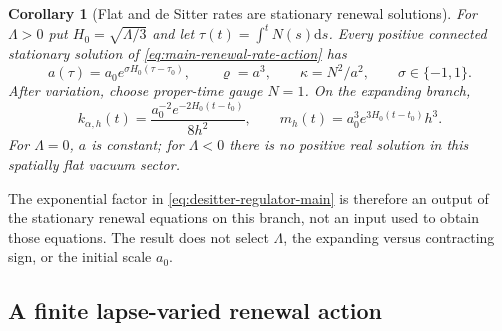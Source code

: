 \documentclass[11pt]{article}
\newtheorem{corollary}[corollary]{Corollary}
\theoremstyle{definition}
\theoremstyle{remark}
\newcommand{\dd}{\mathrm d}
\begin{document}
\begin{corollary}[Flat and de Sitter rates are stationary renewal solutions]
\label{cor:main-derived-desitter-rates}
For $\Lambda>0$ put $H_0=\sqrt{\Lambda/3}$ and let
$\tau(t)=\int^tN(s)\dd s$.  Every positive connected stationary solution of
\eqref{eq:main-renewal-rate-action} has
\begin{equation}
 a(\tau)=a_0e^{\sigma H_0(\tau-\tau_0)},\qquad
 \varrho=a^3,\qquad
 \kappa=N^2/a^2,
 \qquad \sigma\in\{-1,1\}.
 \label{eq:main-stationary-homogeneous-solutions}
\end{equation}
After variation, choose proper-time gauge $N=1$.  On the expanding branch,
\begin{equation}
 \boxed{
 k_{\alpha,h}(t)=
 \frac{a_0^{-2}e^{-2H_0(t-t_0)}}{8h^2},\qquad
 m_h(t)=a_0^3e^{3H_0(t-t_0)}h^3.}
 \label{eq:desitter-regulator-main}
\end{equation}
For $\Lambda=0$, $a$ is constant; for $\Lambda<0$ there is no positive real
solution in this spatially flat vacuum sector.
\end{corollary}

The exponential factor in \eqref{eq:desitter-regulator-main} is therefore an
output of the stationary renewal equations on this branch, not an input used to
obtain those equations.  The result does not select $\Lambda$, the expanding
versus contracting sign, or the initial scale $a_0$.

\subsection{A finite lapse-varied renewal action}
\label{subsec:finite-homogeneous-action-main}
\end{document}
